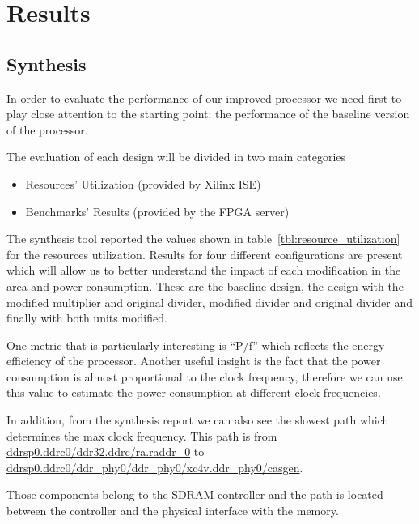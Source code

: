 \renewcommand{\kHz}{\si{\kHz}\xspace}
\renewcommand{\MHz}{\si{\MHz}\xspace}
\renewcommand{\W}{\si{\W}\xspace}
\renewcommand{\s}{\si{\s}\xspace}
\newcommand{\Oppers}{~\si[per-mode=symbol]{Op\per\s}\xspace}


\section{Results}
\label{sec:results}
\subsection{Synthesis}

In order to evaluate the performance of our improved processor we need first to play close attention to the starting point: the
performance of the baseline version of the processor.

The evaluation of each design will be divided in two main categories
\begin{itemize}
\item Resources' Utilization (provided by Xilinx ISE)
\item Benchmarks' Results (provided by the FPGA server)
\end{itemize}

The synthesis tool reported the values shown in table~\ref{tbl:resource_utilization} for the resources utilization.
Results for four different configurations are present which will allow us to better understand the impact of each modification in the area and power consumption.
These are the baseline design, the design with the modified multiplier and original divider, modified divider and original divider and finally with both units modified. 

One metric that is particularly interesting is ``P/f'' which reflects the energy efficiency of the processor. Another useful insight is the fact that the power consumption is almost proportional to the clock frequency, therefore we can use this value to estimate the power consumption at different clock frequencies.

In addition, from the synthesis report we can also see the slowest path which determines the max clock frequency.
This path is from \url{ddrsp0.ddrc0/ddr32.ddrc/ra.raddr_0} to \url{ddrsp0.ddrc0/ddr_phy0/ddr_phy0/xc4v.ddr_phy0/casgen}.

Those components belong to the SDRAM controller and the path is located between the controller
and the physical interface with the memory.

